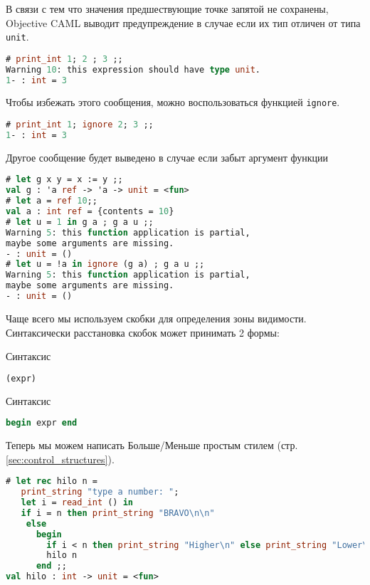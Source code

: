 В связи с тем что значения предшествующие точке запятой не сохранены, Objective
CAML выводит предупреждение в случае если их тип отличен от типа \texttt{unit}.

\begin{lstlisting}[language=OCaml]
# print_int 1; 2 ; 3 ;;
Warning 10: this expression should have type unit.
1- : int = 3
\end{lstlisting}

Чтобы избежать этого сообщения, можно воспользоваться функцией \texttt{ignore}.

\begin{lstlisting}[language=OCaml]
# print_int 1; ignore 2; 3 ;;
1- : int = 3
\end{lstlisting}

Другое сообщение будет выведено в случае если забыт аргумент функции

\begin{lstlisting}[language=OCaml]
# let g x y = x := y ;;
val g : 'a ref -> 'a -> unit = <fun>
# let a = ref 10;;
val a : int ref = {contents = 10}
# let u = 1 in g a ; g a u ;;
Warning 5: this function application is partial,
maybe some arguments are missing.
- : unit = ()
# let u = !a in ignore (g a) ; g a u ;;
Warning 5: this function application is partial,
maybe some arguments are missing.
- : unit = ()
\end{lstlisting}

Чаще всего мы используем скобки для определения зоны видимости. Синтаксически
расстановка скобок может принимать 2 формы:

Синтаксис

\begin{lstlisting}[language=OCaml]
(expr)
\end{lstlisting}

Синтаксис

\begin{lstlisting}[language=OCaml]
begin expr end
\end{lstlisting}

Теперь мы можем написать Больше/Меньше простым стилем (стр.
\ref{sec:control_structures}).

\begin{lstlisting}[language=OCaml]
# let rec hilo n =
   print_string "type a number: ";
   let i = read_int () in
   if i = n then print_string "BRAVO\n\n"
    else
      begin
        if i < n then print_string "Higher\n" else print_string "Lower\n"  ;
        hilo n
      end ;;
val hilo : int -> unit = <fun>
\end{lstlisting}

